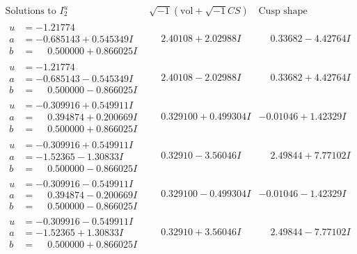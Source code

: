 \documentclass[1p]{elsarticle_modified}
\theoremstyle{definition}
\newcommand{\I}{\sqrt{-1}}
\begin{document}
$$\begin{array}{c|c|c}  
\text{Solutions to }I^u_{2}& \I (\text{vol} + \sqrt{-1}CS) & \text{Cusp shape}\\
 \hline 
\begin{aligned}
u &= -1.21774\phantom{ +0.000000I} \\
a &= -0.685143 + 0.545349 I \\
b &= \phantom{-}0.500000 + 0.866025 I\end{aligned}
 & \phantom{-}2.40108 + 2.02988 I & \phantom{-}0.33682 - 4.42764 I \\ \hline\begin{aligned}
u &= -1.21774\phantom{ +0.000000I} \\
a &= -0.685143 - 0.545349 I \\
b &= \phantom{-}0.500000 - 0.866025 I\end{aligned}
 & \phantom{-}2.40108 - 2.02988 I & \phantom{-}0.33682 + 4.42764 I \\ \hline\begin{aligned}
u &= -0.309916 + 0.549911 I \\
a &= \phantom{-}0.394874 + 0.200669 I \\
b &= \phantom{-}0.500000 + 0.866025 I\end{aligned}
 & \phantom{-}0.329100 + 0.499304 I & -0.01046 + 1.42329 I \\ \hline\begin{aligned}
u &= -0.309916 + 0.549911 I \\
a &= -1.52365 - 1.30833 I \\
b &= \phantom{-}0.500000 - 0.866025 I\end{aligned}
 & \phantom{-}0.32910 - 3.56046 I & \phantom{-}2.49844 + 7.77102 I \\ \hline\begin{aligned}
u &= -0.309916 - 0.549911 I \\
a &= \phantom{-}0.394874 - 0.200669 I \\
b &= \phantom{-}0.500000 - 0.866025 I\end{aligned}
 & \phantom{-}0.329100 - 0.499304 I & -0.01046 - 1.42329 I \\ \hline\begin{aligned}
u &= -0.309916 - 0.549911 I \\
a &= -1.52365 + 1.30833 I \\
b &= \phantom{-}0.500000 + 0.866025 I\end{aligned}
 & \phantom{-}0.32910 + 3.56046 I & \phantom{-}2.49844 - 7.77102 I \\ \hline\begin{aligned}

\end{aligned}
\end{array}$$
\end{document}
